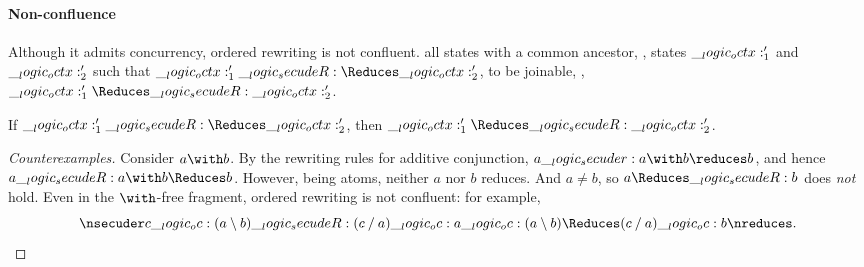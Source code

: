 







\paragraph*{Non-confluence}

Although it admits concurrency, ordered rewriting is not confluent.
 all states with a common ancestor, \ie, states $\__logic_octx:'_1$ and $\__logic_octx:'_2$ such that $\octx'_1 \secudeR\Reduces \octx'_2$, to be joinable, \ie, $\octx'_1 \Reduces\secudeR \octx'_2$.
%
\begin{falseclaim}[Confluence]
  If\/ $\octx'_1 \secudeR\Reduces \octx'_2$, then $\octx'_1 \Reduces\secudeR \octx'_2$.
\end{falseclaim}
%
\begin{proof}[Counterexamples]
  Consider $a \with b$.
  By the rewriting rules for additive conjunction, $a \secuder a \with b \reduces b$, and hence $a \secudeR a \with b \Reduces b$.
  However, being atoms, neither $a$ nor $b$ reduces.
  And $a \neq b$, so $a \Reduces\secudeR b$ does \emph{not} hold.
  Even in the $\with$-free fragment, ordered rewriting is not confluent:
  for example,
  \begin{equation*}
    \nsecuder c \oc (a \limp b) \secudeR (c \pmir a) \oc a \oc (a \limp b) \Reduces (c \pmir a) \oc b \nreduces
    .
    \qedhere
  \end{equation*}
\end{proof}


